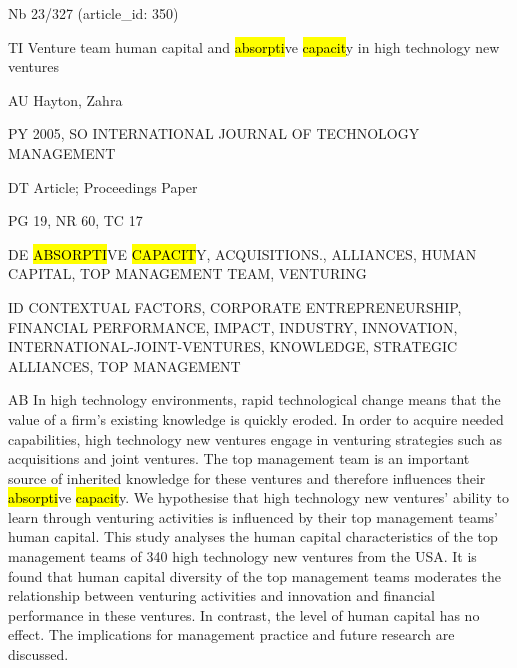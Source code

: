 \documentclass[a4paper]{article}
\begin{document}
\vspace*{-2cm}
Nb \tabto{0cm}23/327 (article\_id: 350)\par
TI \tabto{0cm}Venture team human capital and \hl{absorpti}ve \hl{capacit}y in high technology new ventures\par
AU \tabto{0cm}Hayton, Zahra\par
PY \tabto{0cm}2005, SO INTERNATIONAL JOURNAL OF TECHNOLOGY MANAGEMENT\par
DT \tabto{0cm}Article; Proceedings Paper\par
PG \tabto{0cm}19, NR 60, TC 17\par
DE \tabto{0cm}\hl{ABSORPTI}VE \hl{CAPACIT}Y, ACQUISITIONS., ALLIANCES, HUMAN CAPITAL, TOP MANAGEMENT TEAM, VENTURING\par
ID \tabto{0cm}CONTEXTUAL FACTORS, CORPORATE ENTREPRENEURSHIP, FINANCIAL PERFORMANCE, IMPACT, INDUSTRY, INNOVATION, INTERNATIONAL-JOINT-VENTURES, KNOWLEDGE, STRATEGIC ALLIANCES, TOP MANAGEMENT\par
AB \tabto{0cm}In high technology environments, rapid technological change means that the value of a firm's existing knowledge is quickly eroded. In order to acquire needed capabilities, high technology new ventures engage in venturing strategies such as acquisitions and joint ventures. The top management team is an important source of inherited knowledge for these ventures and therefore influences their \hl{absorpti}ve \hl{capacit}y. We hypothesise that high technology new ventures' ability to learn through venturing activities is influenced by their top management teams' human capital. This study analyses the human capital characteristics of the top management teams of 340 high technology new ventures from the USA. It is found that human capital diversity of the top management teams moderates the relationship between venturing activities and innovation and financial performance in these ventures. In contrast, the level of human capital has no effect. The implications for management practice and future research are discussed.\par
\clearpage
\end{document}
